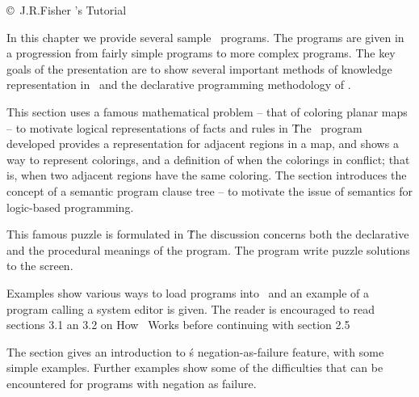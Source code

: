 \secdown

\copyright\ J.R.Fisher 's \prolog
Tutorial\ 

\bigskip





\label{fish2}\secdown

In this chapter we provide several sample \prolog\ programs. The programs are
given in a progression from fairly simple programs to more complex programs. The
key goals of the presentation are to show several important methods of knowledge
representation in \prolog\ and the declarative programming methodology of
\prolog.


This section uses a famous mathematical problem -- that of coloring planar maps
-- to motivate logical representations of facts and rules in \prolog\. The \prolog\
program developed provides a representation for adjacent regions in a map, and
shows a way to represent colorings, and a definition of when the colorings in
conflict; that is, when two adjacent regions have the same coloring. The
section introduces the concept of a semantic program clause tree -- to motivate
the issue of semantics for logic-based programming.




This famous puzzle is formulated in \prolog\. The discussion concerns both the
declarative and the procedural meanings of the program. The program write puzzle
solutions to the screen.
 

Examples show various ways to load programs into \prolog\, and an example of a
program calling a system editor is given. The reader is encouraged to read
sections 3.1 an 3.2 on How \prolog\ Works before continuing with section 2.5
 

The section gives an introduction to \prolog\'s negation-as-failure feature, with
some simple examples. Further examples show some of the difficulties that can be
encountered for programs with negation as failure.


